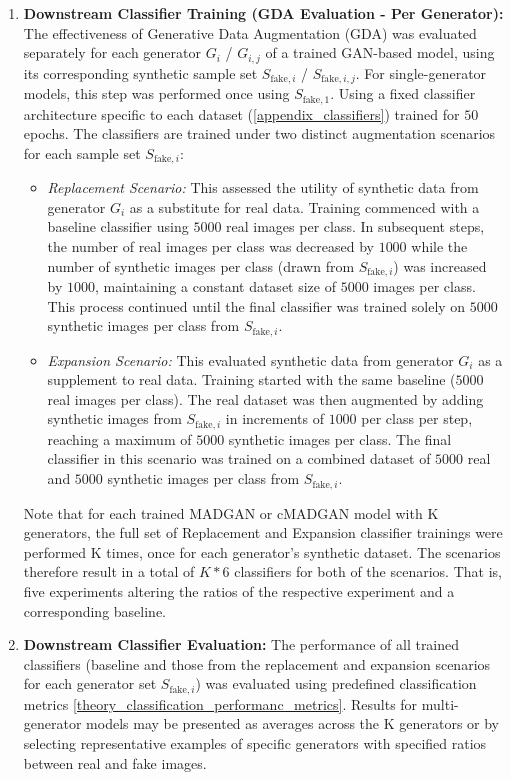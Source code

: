 \begin{enumerate}
    \item \textbf{Downstream Classifier Training (GDA Evaluation - Per Generator):} The effectiveness of Generative Data Augmentation (GDA) was evaluated separately for each generator \(G_i\) / \(G_{i, j}\) of a trained GAN-based model, using its corresponding synthetic sample set \(S_{\text{fake}, i}\) / \(S_{\text{fake}, i, j}\). For single-generator models, this step was performed once using \(S_{\text{fake}, 1}\). Using a fixed classifier architecture specific to each dataset (\ref{appendix_classifiers}) trained for $50$ epochs. The classifiers are trained under two distinct augmentation scenarios for each sample set \(S_{\text{fake}, i}\):
        \begin{itemize} \label{exp_setup_difference_replace_expand}
            \item \textit{Replacement Scenario:} This assessed the utility of synthetic data from generator \(G_i\) as a substitute for real data. Training commenced with a baseline classifier using $5 000$ real images per class. In subsequent steps, the number of real images per class was decreased by $1 000$ while the number of synthetic images per class (drawn from \(S_{\text{fake}, i}\)) was increased by $1 000$, maintaining a constant dataset size of $5 000$ images per class. This process continued until the final classifier was trained solely on $5 000$ synthetic images per class from \(S_{\text{fake}, i}\).
            \item \textit{Expansion Scenario:} This evaluated synthetic data from generator \(G_i\) as a supplement to real data. Training started with the same baseline ($5 000$ real images per class). The real dataset was then augmented by adding synthetic images from \(S_{\text{fake}, i}\) in increments of $1 000$ per class per step, reaching a maximum of $5 000$ synthetic images per class. The final classifier in this scenario was trained on a combined dataset of $5 000$ real and $5 000$ synthetic images per class from \(S_{\text{fake}, i}\).
        \end{itemize}
      Note that for each trained MADGAN or cMADGAN model with K generators, the full set of Replacement and Expansion classifier trainings were performed K times, once for each generator's synthetic dataset. The scenarios therefore result in a total of $K * 6$ classifiers for both of the scenarios. That is, five experiments altering the ratios of the respective experiment and a corresponding baseline. 

    \item \textbf{Downstream Classifier Evaluation:} The performance of all trained classifiers (baseline and those from the replacement and expansion scenarios for each generator set \(S_{\text{fake}, i}\)) was evaluated using predefined classification metrics \ref{theory_classification_performanc_metrics}. Results for multi-generator models may be presented as averages across the K generators or by selecting representative examples of specific generators with specified ratios between real and fake images.
\end{enumerate}

